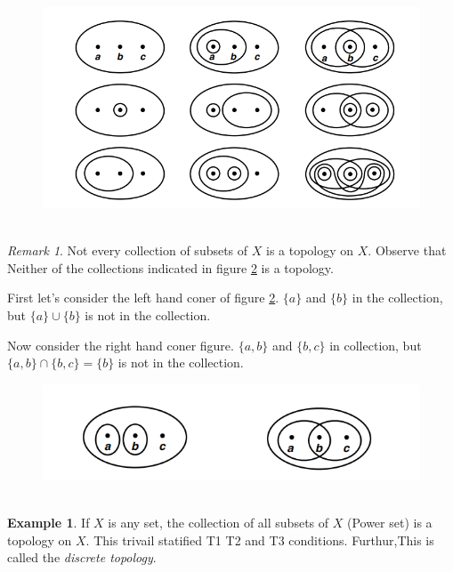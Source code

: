 \documentclass[
]{book}
\theoremstyle{definition}
\theoremstyle{definition}
\newtheorem{example}{Example}[chapter]
\theoremstyle{definition}
\theoremstyle{definition}
\theoremstyle{remark}
\newtheorem*{remark}{Remark}
\begin{document}
\begin{figure}
\centering
\includegraphics{figures/figure 01.png}
\caption{\label{fig:gi}\(~\)}
\end{figure}

\begin{remark}
Not every collection of subsets of \(X\) is a topology on \(X\). Observe that Neither of the collections indicated in figure \ref{fig:fig2} is a topology.

First let's consider the left hand coner of figure \ref{fig:fig2}. \(\{a\}\) and \(\{b\}\) in the collection, but \(\{a\}\cup \{b\}\) is not in the collection.

Now consider the right hand coner figure. \(\{a,b\}\) and \(\{b,c\}\) in collection, but \(\{a,b\}\cap\{b,c\}=\{b\}\) is not in the collection.
\end{remark}

\begin{figure}
\centering
\includegraphics{figures/figure 02.png}
\caption{\label{fig:fig2}\(~\)}
\end{figure}

\begin{example}
\protect\hypertarget{exm:unnamed-chunk-4}{}\label{exm:unnamed-chunk-4}If \(X\) is any set, the collection of all subsets of \(X\) (Power set) is a topology on \(X\). This trivail statified T1 T2 and T3 conditions. Furthur,This is called the \emph{discrete topology}.
\end{example}
\end{document}
